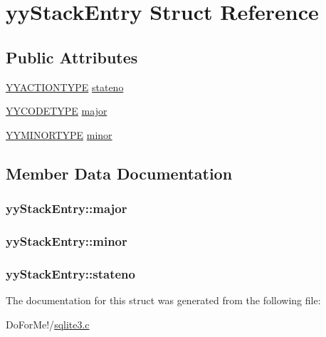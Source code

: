 \hypertarget{structyy_stack_entry}{\section{yy\-Stack\-Entry Struct Reference}
\label{structyy_stack_entry}
}
\subsection*{Public Attributes}
\begin{DoxyCompactItemize}
\item 
\hyperlink{sqlite3_8c_a55d614396573a00ff0567ea215ad023c}{Y\-Y\-A\-C\-T\-I\-O\-N\-T\-Y\-P\-E} \hyperlink{structyy_stack_entry_a108164609c2e841577cc3533d8f0180d}{stateno}
\item 
\hyperlink{sqlite3_8c_a17940350736cfe265cebeb0472fdbbed}{Y\-Y\-C\-O\-D\-E\-T\-Y\-P\-E} \hyperlink{structyy_stack_entry_a7624d02bcf945d48068f4c383551725c}{major}
\item 
\hyperlink{union_y_y_m_i_n_o_r_t_y_p_e}{Y\-Y\-M\-I\-N\-O\-R\-T\-Y\-P\-E} \hyperlink{structyy_stack_entry_a024e1e64bce5945080629a2dd8d1bb4f}{minor}
\end{DoxyCompactItemize}


\subsection{Member Data Documentation}
\hypertarget{structyy_stack_entry_a7624d02bcf945d48068f4c383551725c}{
\subsubsection[{major}]{ yy\-Stack\-Entry\-::major}}\label{structyy_stack_entry_a7624d02bcf945d48068f4c383551725c}
\hypertarget{structyy_stack_entry_a024e1e64bce5945080629a2dd8d1bb4f}{
\subsubsection[{minor}]{ yy\-Stack\-Entry\-::minor}}\label{structyy_stack_entry_a024e1e64bce5945080629a2dd8d1bb4f}
\hypertarget{structyy_stack_entry_a108164609c2e841577cc3533d8f0180d}{
\subsubsection[{stateno}]{ yy\-Stack\-Entry\-::stateno}}\label{structyy_stack_entry_a108164609c2e841577cc3533d8f0180d}


The documentation for this struct was generated from the following file\-:\begin{DoxyCompactItemize}
\item 
Do\-For\-Me!/\hyperlink{sqlite3_8c}{sqlite3.\-c}\end{DoxyCompactItemize}
